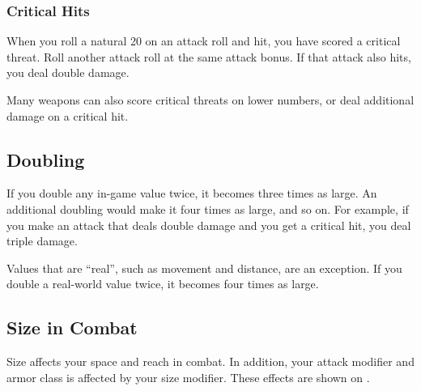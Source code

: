 \subsubsection{Critical Hits}
When you roll a natural 20 on an attack roll and hit, you have scored a critical threat. Roll another attack roll at the same attack bonus. If that attack also hits, you deal double damage.

Many weapons can also score critical threats on lower numbers, or deal additional damage on a critical hit.

\subsection{Doubling}
If you double any in-game value twice, it becomes three times as large. An additional doubling would make it four times as large, and so on. For example, if you make an attack that deals double damage and you get a critical hit, you deal triple damage.

 Values that are ``real'', such as movement and distance, are an exception. If you double a real-world value twice, it becomes four times as large. 

\subsection{Size in Combat}
Size affects your space and reach in combat. In addition, your attack modifier and armor class is affected by your size modifier. These effects are shown on . 

